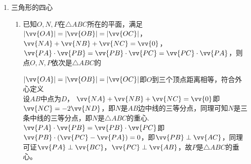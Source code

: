\begin{enumerate}
\begin{enumerate}
        \item 在 $\bigtriangleup  {ABC}$ 中, $\vv{AB} = \left( {\sqrt{3}\cos x,\cos x}\right) ,\vv{AC} = \left( {\cos x,\sin x}\right)$ . 对任意的实数 $t$ ,恒有 $\left| {\vv{AB} - t\vv{AC}}\right|  \geq  \left| \vv{BC}\right|$ ,则 $\bigtriangleup {ABC}$ 面积的最大值为.
        \begin{jieda}
            $\because \left| {\vv{AB} - t\vv{AC}}\right|  \geq  \left| \vv{BC}\right|$ ，故点 $B$ 到直线 ${AC}$ 的最短距离为 ${BC}$ ， $\therefore {BC}\bot {AC}$ . $\because \left| \vv{AB}\right|  = \sqrt{4{\cos }^{2}x} \leq  2,\left| \vv{AC}\right|  = 1$ ， $\therefore$ 由勾股定理可得 ${BC} = \sqrt{A{B}^2 - A{C}^2} \leq  \sqrt{4 - 1} = \sqrt{3}$ ， 故 $\bigtriangleup {ABC}$ 面积 $S = \dfrac{1}{2}{BC} \cdot  {AC} \leq  \dfrac{\sqrt{3}}{2}$.
        \end{jieda}
    \end{enumerate}
    \item 三角形的四心
    \begin{enumerate}
        \item 已知$O, N, P$在$\triangle ABC$所在的平面，满足$|\vv{OA}| = |\vv{OB}| = |\vv{OC}|$，$\vv{NA} + \vv{NB} + \vv{NC} = \vv{0}$，$\vv{PA} \cdot \vv{PB} = \vv{PB} \cdot \vv{PC} = \vv{PC} \cdot \vv{PA}$，则点$O, N, P$依次是$\triangle ABC$的 
        \begin{jieda}
            $|\vv{OA}| = |\vv{OB}| = |\vv{OC}|$即$O$到三个顶点距离相等，符合外心定义\\
            设$AB$中点为$D$，
            $\vv{NA} + \vv{NB} + \vv{NC} = \vv{0}$即$\vv{NC} = -2\vv{ND}$，即$N$是$AB$边中线的三等分点，同理可知$N$是三条中线的三等分点，即$N$是$\triangle ABC$的重心. \\
            $\vv{PA} \cdot \vv{PB} = \vv{PB} \cdot \vv{PC}$即$\vv{PB} \cdot (\vv{PC} - \vv{PA}) = 0$，即$\vv{PB} \perp \vv{AC}$，同理可证$\vv{PA} \perp \vv{BC}$，$\vv{PC} \perp \vv{AB}$，故$P$是$\triangle ABC$的垂心。
        \end{jieda}


\end{enumerate}
\end{enumerate}
